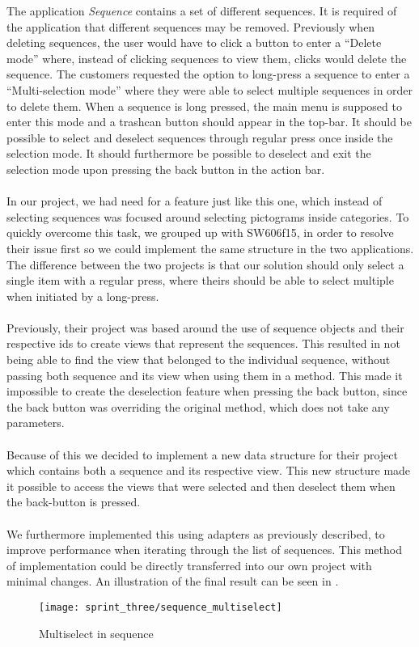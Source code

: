 The application \emph{Sequence} contains a set of different sequences. It is required of the application that different sequences may be removed. Previously when deleting sequences, the user would have to click a button to enter a ``Delete mode'' where, instead of clicking sequences to view them, clicks would delete the sequence. The customers requested the option to long-press a sequence to enter a ``Multi-selection mode'' where they were able to select multiple sequences in order to delete them. When a sequence is long pressed, the main menu is supposed to enter this mode and a trashcan button should appear in the top-bar. It should be possible to select and deselect sequences through regular press once inside the selection mode. It should furthermore be possible to deselect and exit the selection mode upon pressing the back button in the action bar.
\\\\
In our project, we had need for a feature just like this one, which instead of selecting sequences was focused around selecting pictograms inside categories. To quickly overcome this task, we grouped up with SW606f15, in order to resolve their issue first so we could implement the same structure in the two applications. The difference between the two projects is that our solution should only select a single item with a regular press, where theirs should be able to select multiple when initiated by a long-press.
\\\\
Previously, their project was based around the use of sequence objects and their respective ids to create views that represent the sequences. This resulted in not being able to find the view that belonged to the individual sequence, without passing both sequence and its view when using them in a method. This made it impossible to create the deselection feature when pressing the back button, since the back button was overriding the original  method, which does not take any parameters.
\\\\ 
Because of this we decided to implement a new data structure for their project which contains both a sequence and its respective view. This new structure made it possible to access the views that were selected and then deselect them when the back-button is pressed. 
\\\\
We furthermore implemented this using adapters as previously described, to improve performance when iterating through the list of sequences. This method of implementation could be directly transferred into our own project with minimal changes. An illustration of the final result can be seen in .

\begin{figure}[!htbp]
	\centering
	\texttt{[image: sprint\_three/sequence\_multiselect]}
	\caption{Multiselect in sequence}
	\label{fig:sequence_multiselect}
\end{figure}